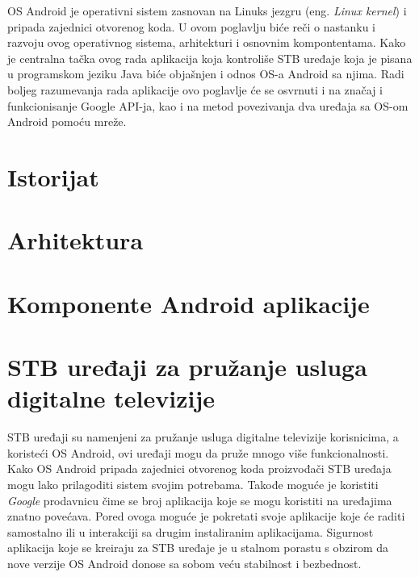 \documentclass[../TamaraIvanovicMasterRad.tex]{subfiles}
\begin{document}
OS Android je operativni sistem zasnovan na Linuks jezgru (eng. \textit{Linux kernel}) i pripada zajednici otvorenog koda. U ovom poglavlju biće reči o nastanku i razvoju ovog operativnog sistema, arhitekturi i osnovnim kompontentama. Kako je centralna tačka ovog rada aplikacija koja kontroliše STB uređaje koja je pisana u programskom jeziku Java biće objašnjen i odnos OS-a Android sa njima. Radi boljeg razumevanja rada aplikacije ovo poglavlje će se osvrnuti i na značaj i funkcionisanje Google API-ja, kao i na metod povezivanja dva uređaja sa OS-om Android pomoću mreže. 
\section{Istorijat}



\section{Arhitektura}



\section{Komponente Android aplikacije}


\section{STB uređaji za pružanje usluga digitalne televizije}
STB uređaji su namenjeni za pružanje usluga digitalne televizije korisnicima, a koristeći OS Android, ovi uređaji mogu da pruže mnogo više funkcionalnosti. Kako OS Android pripada zajednici otvorenog koda proizvođači STB uređaja mogu lako prilagoditi sistem svojim potrebama. Takođe moguće je koristiti \textit{Google} prodavnicu čime se broj aplikacija koje se mogu koristiti na uređajima znatno povećava. Pored ovoga moguće je pokretati svoje aplikacije koje će raditi samostalno ili u interakciji sa drugim instaliranim aplikacijama. Sigurnost aplikacija koje se kreiraju za STB uređaje je u stalnom porastu s obzirom da nove verzije OS Android donose sa sobom veću stabilnost i bezbednost. 
\end{document}

